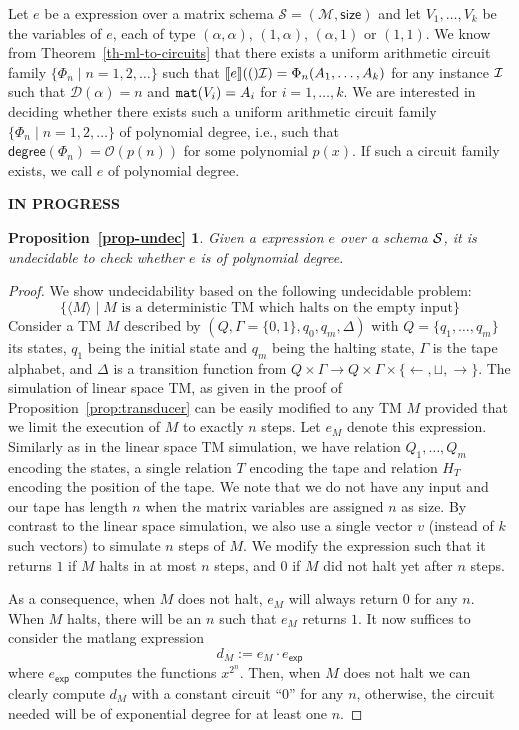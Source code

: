 \newtheorem*{Undec}{Proposition~\ref{prop-undec}}
Let $e$ be a \langfor expression over a matrix schema $\mathcal{S}=(\mathcal{M},\textsf{size})$ and let $V_1,\ldots, V_k$ be
the variables of $e$, each of type $(\alpha,\alpha)$, $(1,\alpha)$, $(\alpha,1)$ or $(1,1)$. We know from Theorem~\ref{th-ml-to-circuits}
that there exists a uniform arithmetic circuit family $\{\Phi_n \mid n=1,2,\ldots\}$
such that $\llbracket e \rrbracket(()\mathcal{I})=\Phi_n(A_1,\ldots,A_k)$ for any instance $\mathcal{I}$ such that
$\mathcal{D}(\alpha)=n$ and $\texttt{mat}(V_i)=A_i$ for $i=1,\ldots,k$. We are interested in deciding
whether there exists such a  uniform arithmetic circuit family $\{\Phi_n \mid n=1,2,\ldots\}$
of polynomial degree, i.e., such that $\mathsf{degree}(\Phi_n)=\mathcal{O}(p(n))$ for some polynomial $p(x)$. If such a circuit family exists, we call $e$ of polynomial degree.

{\bf IN PROGRESS}

\begin{Undec}
	Given a \langfor expression $e$ over a schema $\mathcal{S}$, it is undecidable to check whether $e$ is of polynomial degree.
\end{Undec}
\begin{proof}
We show undecidability based on the following undecidable problem:
$$
\{ \langle M\rangle\mid \text{$M$ is a deterministic TM which halts on the empty input}\}
$$
Consider a TM $M$ described by $(Q,\Gamma=\{0,1\},q_0,q_m,\Delta)$
with $Q=\{q_1,\ldots,q_m\}$ its states, $q_1$ being the initial state and $q_m$ being
the halting state, $\Gamma$ is the tape alphabet, and $\Delta$ is a transition function
from $Q\times \Gamma\to Q\times\Gamma\times \{\leftarrow,\sqcup,\rightarrow\}$. The simulation
of linear space TM, as given in the proof of Proposition~\ref{prop:transducer} can be easily modified to
any TM $M$ provided that we limit the execution of $M$ to exactly $n$ steps. Let $e_M$ denote this expression. Similarly
as in the linear space TM simulation, we have relation $Q_1,\ldots,Q_m$ encoding the
states, a single relation $T$ encoding the tape and relation $H_T$ encoding the position
of the tape. We note that we do not have any input and our tape has length $n$ when the matrix variables are assigned $n$ as size. By contrast to the linear space 
simulation, we also use a single vector $v$ (instead of $k$ such vectors) 
to simulate $n$ steps of $M$. We modify the expression such that it returns $1$ if $M$
halts in at most $n$ steps, and $0$ if $M$ did not halt yet after $n$ steps.

As a consequence, when $M$ does not halt, $e_M$ will always return $0$
for any $n$. When $M$ halts, there will be an $n$ such that $e_M$ returns $1$.
It now suffices to consider the matlang expression
$$
d_M:=e_M\cdot e_{\mathsf{exp}}
$$
where $e_{\mathsf{exp}}$ computes the functions $x^{2^n}$. 
Then, when $M$ does not halt we can clearly compute $d_M$ with a constant circuit ``0''
for any $n$, otherwise, the circuit needed will be of exponential degree
for at least one $n$. 
\end{proof}


